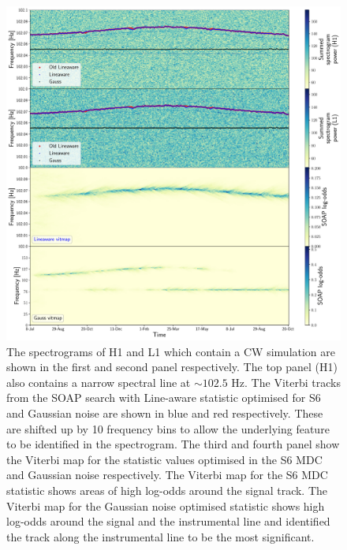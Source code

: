 \begin{figure}[h]
    \centering
    \includegraphics[width=1.0\linewidth]{C3_soap/line_example.pdf}
	\caption[Example of improvements when using optimised parameters for line aware statistic.]{ The spectrograms of H1 and L1 which contain a \gls{CW} simulation are shown in the first and second panel respectively. The top panel (H1) also contains a narrow spectral line at $\sim 102.5$ Hz.
	The Viterbi tracks from the SOAP search with Line-aware statistic optimised for S6 and Gaussian noise are shown in blue and red respectively. These are shifted up by 10 frequency bins to allow the underlying feature to be identified in the spectrogram. The third and fourth panel show the Viterbi map for the statistic values optimised in the S6 MDC and Gaussian noise respectively. The Viterbi map for the S6 \gls{MDC} statistic shows areas of high log-odds around the signal track. The Viterbi map for the Gaussian noise optimised statistic shows high log-odds around the signal and the instrumental line and identified the track along the instrumental line to be the most significant.}
    \label{soap:las:optimisation:vitexample}
\end{figure}

